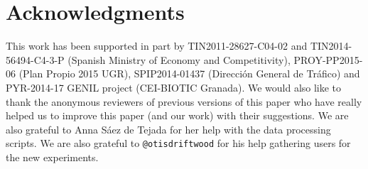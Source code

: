 \documentclass[letterpaper]{article}
\begin{document}
\section*{Acknowledgments}

This work has been supported in part by TIN2011-28627-C04-02 and
TIN2014-56494-C4-3-P (Spanish Ministry of Economy and Competitivity),
PROY-PP2015-06 (Plan Propio 2015 UGR),  %
SPIP2014-01437 (Direcci{\'o}n General de Tr{\'a}fico) and PYR-2014-17
GENIL project (CEI-BIOTIC Granada). We would also like to thank the
anonymous reviewers of previous versions of this paper who have really
helped us to improve 
this paper (and our work) with their suggestions. We are also grateful
to Anna S\'aez de Tejada for her help with the data processing
scripts. We are also grateful to {\tt @otisdriftwood} for his help
gathering users for the new experiments. 




\end{document}
